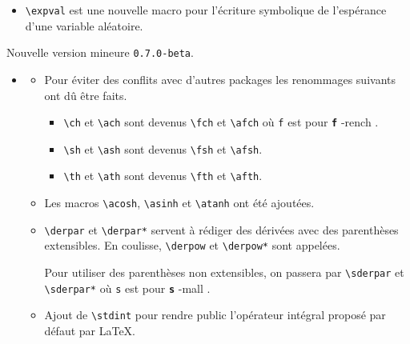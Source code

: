 \documentclass[12pt,a4paper]{book}
\makeatletter
\newcommand\env[1]{\texttt{#1}}
\newcommand\macro[1]{\env{\textbackslash{}#1}}
\theoremstyle{definition}
\newcommand\whyprefix[2]{%
	\textbf{\prefix{#1}}-#2%
}
\newcommand\prefix[1]{%
	\texttt{#1}%
}
\newcommand\topic{\@ifstar{\@topic@star}{\@topic@no@star}}
\newcommand\@topic@no@star[1]{%
	\textbf{\textsc{#1}.}%
}
\newcommand\@topic@star[1]{%
	\textbf{\textsc{#1} :}%
}
\makeatother
\begin{document}
{{\begin{description}
\begin{itemize}[itemsep=.5em]
\begin{itemize}[itemsep=.5em]
            \item \macro{expval} est une nouvelle macro pour l'écriture symbolique de l'espérance d'une  variable aléatoire.
        \end{itemize}
    \end{itemize}
    


    \medskip
    \item[2020-06-08] Nouvelle version mineure \verb+0.7.0-beta+.
    
    \begin{itemize}[itemsep=.5em]
        \item \topic{Analyse}
        \begin{itemize}[itemsep=.5em]
            \item Pour éviter des conflits avec d'autres packages les renommages suivants ont dû être faits.
            \begin{itemize}[itemsep=.5em, label=$\rightarrow$]
                \item \macro{ch} et \macro{ach} sont devenus \macro{fch} et \macro{afch} où \prefix{f} est pour \whyprefix{f}{rench}.
    
                \item \macro{sh} et \macro{ash} sont devenus \macro{fsh} et \macro{afsh}.
    
                \item \macro{th} et \macro{ath} sont devenus \macro{fth} et \macro{afth}.
            \end{itemize}
    
    		\item Les macros \macro{acosh}, \macro{asinh} et \macro{atanh} ont été ajoutées.
    
     		\item \macro{derpar} et \macro{derpar*} servent à rédiger des dérivées avec des parenthèses extensibles. En coulisse, \macro{derpow} et \macro{derpow*} sont appelées.
    
            Pour utiliser des parenthèses non extensibles, on passera par \macro{sderpar} et \macro{sderpar*} où \prefix{s} est pour \whyprefix{s}{mall}.
    
    		\item Ajout de \macro{stdint} pour rendre public l'opérateur intégral proposé par défaut par \LaTeX.
        \end{itemize}
    
    
    

\end{itemize}
\end{description}}}
\end{document}
